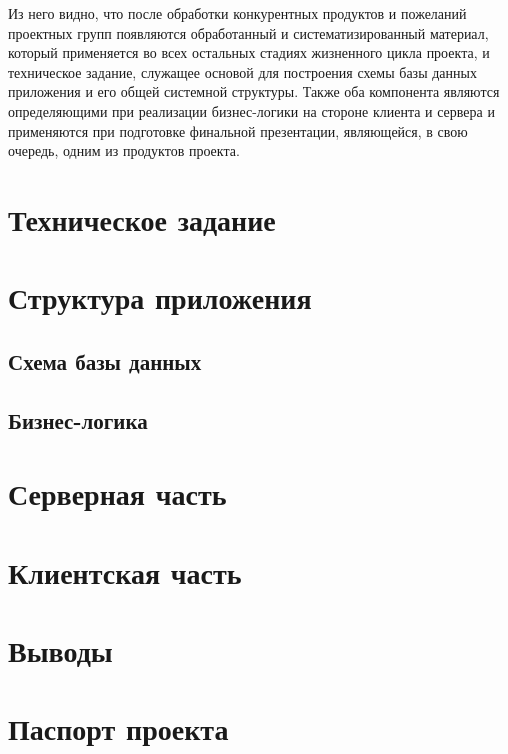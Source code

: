 \documentclass[a4paper, 14pt]{extarticle}
\begin{document}
Из него видно, что после обработки конкурентных продуктов и пожеланий проектных групп появляются обработанный и систематизированный материал, который применяется во всех остальных стадиях жизненного цикла проекта, и техническое задание, служащее основой для построения схемы базы данных приложения и его общей системной структуры. Также оба компонента являются определяющими при реализации бизнес-логики на стороне клиента и сервера и применяются при подготовке финальной презентации, являющейся, в свою очередь, одним из продуктов проекта.

\newpage


\section{Техническое задание}

\newpage


\section{Структура приложения}
  \subsection{Схема базы данных}
  
  \subsection{Бизнес-логика}
  
\newpage


\section{Серверная часть} %

\newpage


\section{Клиентская часть} %

\newpage


\section{Выводы}

\newpage


\section{Паспорт проекта}
\end{document}
